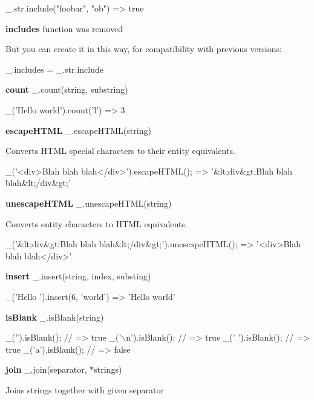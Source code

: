 \begin{DoxyCode}
\_.str.include("foobar", "ob")
=> true
\end{DoxyCode}


{\bfseries includes} function was removed

But you can create it in this way, for compatibility with previous versions\+:


\begin{DoxyCode}
\_.includes = \_.str.include
\end{DoxyCode}


{\bfseries count} \+\_\+.\+count(string, substring)


\begin{DoxyCode}
\_('Hello world').count('l')
=> 3
\end{DoxyCode}


{\bfseries escape\+H\+T\+ML} \+\_\+.\+escape\+H\+T\+M\+L(string)

Converts H\+T\+ML special characters to their entity equivalents.


\begin{DoxyCode}
\_('<div>Blah blah blah</div>').escapeHTML();
=> '&lt;div&gt;Blah blah blah&lt;/div&gt;'
\end{DoxyCode}


{\bfseries unescape\+H\+T\+ML} \+\_\+.\+unescape\+H\+T\+M\+L(string)

Converts entity characters to H\+T\+ML equivalents.


\begin{DoxyCode}
\_('&lt;div&gt;Blah blah blah&lt;/div&gt;').unescapeHTML();
=> '<div>Blah blah blah</div>'
\end{DoxyCode}


{\bfseries insert} \+\_\+.\+insert(string, index, substing)


\begin{DoxyCode}
\_('Hello ').insert(6, 'world')
=> 'Hello world'
\end{DoxyCode}


{\bfseries is\+Blank} \+\_\+.\+is\+Blank(string)


\begin{DoxyCode}
\_('').isBlank(); // => true
\_('\(\backslash\)n').isBlank(); // => true
\_(' ').isBlank(); // => true
\_('a').isBlank(); // => false
\end{DoxyCode}


{\bfseries join} \+\_\+.\+join(separator, $\ast$strings)

Joins strings together with given separator


